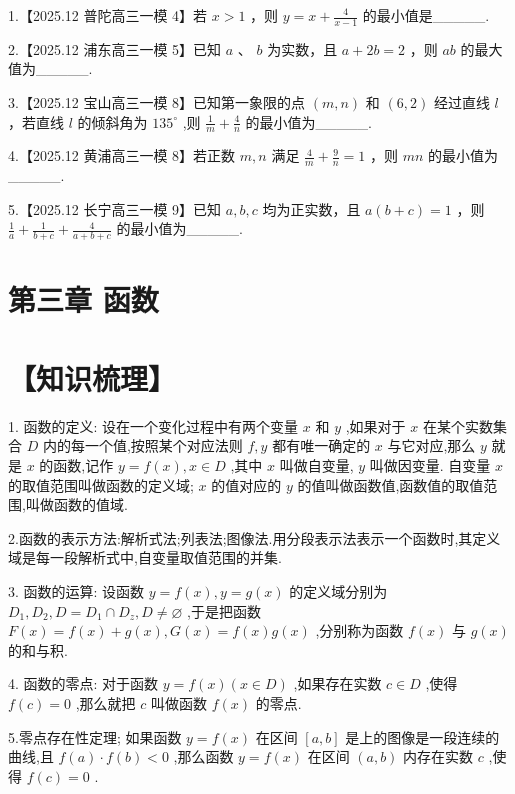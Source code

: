 \documentclass[10pt]{article}
\begin{document}
1.【2025.12 普陀高三一模 4】若 \(x > 1\) ，则 \(y = x + \frac{4}{x - 1}\) 的最小值是\_\_\_\_\_.

2.【2025.12 浦东高三一模 5】已知 \(a\text{ 、 }b\) 为实数，且 \(a + {2b} = 2\) ，则 \({ab}\) 的最大值为\_\_\_\_\_.

3.【2025.12 宝山高三一模 8】已知第一象限的点 \(\left( {m,n}\right)\) 和 \(\left( {6,2}\right)\) 经过直线 \(l\) ，若直线 \(l\) 的倾斜角为 \({135}^{ \circ  }\) ,则 \(\frac{1}{m} + \frac{4}{n}\) 的最小值为\_\_\_\_\_.

4.【2025.12 黄浦高三一模 8】若正数 \(m,n\) 满足 \(\frac{4}{m} + \frac{9}{n} = 1\) ，则 \({mn}\) 的最小值为\_\_\_\_\_.

5.【2025.12 长宁高三一模 9】已知 \(a,b,c\) 均为正实数，且 \(a\left( {b + c}\right)  = 1\) ，则 \(\frac{1}{a} + \frac{1}{b + c} + \frac{4}{a + b + c}\) 的最小值为\_\_\_\_\_.

\section*{第三章 函数}

\section*{【知识梳理】}

1. 函数的定义: 设在一个变化过程中有两个变量 \(x\) 和 \(y\) ,如果对于 \(x\) 在某个实数集合 \(D\) 内的每一个值,按照某个对应法则 \(f,y\) 都有唯一确定的 \(x\) 与它对应,那么 \(y\) 就是 \(x\) 的函数,记作 \(y = f\left( x\right) ,x \in  D\) ,其中 \(x\) 叫做自变量, \(y\) 叫做因变量. 自变量 \(x\) 的取值范围叫做函数的定义域; \(x\) 的值对应的 \(y\) 的值叫做函数值,函数值的取值范围,叫做函数的值域.

2.函数的表示方法:解析式法;列表法;图像法.用分段表示法表示一个函数时,其定义域是每一段解析式中,自变量取值范围的并集.

3. 函数的运算: 设函数 \(y = f\left( x\right) ,y = g\left( x\right)\) 的定义域分别为 \({D}_{1},{D}_{2},D = {D}_{1} \cap  {D}_{z},D \neq  \varnothing\) ,于是把函数 \(F\left( x\right)  = f\left( x\right)  + g\left( x\right) ,G\left( x\right)  = f\left( x\right) g\left( x\right)\) ,分别称为函数 \(f\left( x\right)\) 与 \(g\left( x\right)\) 的和与积.

4. 函数的零点: 对于函数 \(y = f\left( x\right) \left( {x \in  D}\right)\) ,如果存在实数 \(c \in  D\) ,使得 \(f\left( c\right)  = 0\) ,那么就把 \(c\) 叫做函数 \(f\left( x\right)\) 的零点.

5.零点存在性定理; 如果函数 \(y = f\left( x\right)\) 在区间 \(\left\lbrack  {a,b}\right\rbrack\) 是上的图像是一段连续的曲线,且 \(f\left( a\right)  \cdot  f\left( b\right)  < 0\) ,那么函数 \(y = f\left( x\right)\) 在区间 \(\left( {a,b}\right)\) 内存在实数 \(c\) ,使得 \(f\left( c\right)  = 0\) .
\end{document}

